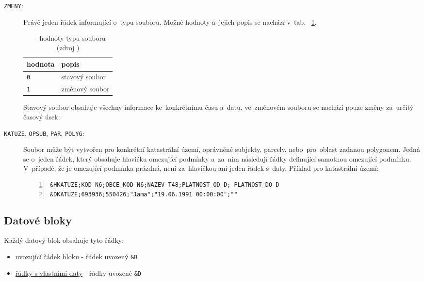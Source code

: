 \begin{description}
	\item[\texttt{ZMENY}:] Právě jeden řádek informující o~typu
souboru. Možné hodnoty a~jejich popis se nachází v~tab.~
\ref{tab:zmeny}.

    \begin{table}[H]
        \begin{tabular}{|l|l|} \hline hodnota & popis \\ \hline \hline
\texttt{0} & stavový soubor \\ \hline \texttt{1} & změnový soubor \\
\hline
        \end{tabular} \centering
        \caption[~– hodnoty typu souborů]{~– hodnoty
typu souborů (zdroj \citep{struktura_vfk})}
        \label{tab:zmeny}
    \end{table}

Stavový soubor obsahuje všechny informace ke~konkrétnímu času a~datu,
ve~změno\-vém souboru se nachází pouze změny za~určitý časový úsek.

	\item[\texttt{KATUZE}, \texttt{OPSUB}, \texttt{PAR},
\texttt{POLYG}:] Soubor  může být vytvořen pro konkrétní
kata\-strální území, oprávněné subjekty, parcely, nebo~pro~oblast
zadanou polygonem. Jedná se o~jeden řádek, který obsahuje hlavičku
omezující podmínky a~za~ním následují řádky definující samotnou
omezující podmínku. V~případě, že je omezující podmínka prázdná, není
za~hlavičkou ani jeden řádek s~daty. Příklad pro katastrální území:

\begin{lstlisting}[basicstyle=\footnotesize\ttfamily, backgroundcolor
    = \color{light-gray}, numbers=left]
&HKATUZE;KOD N6;OBCE_KOD N6;NAZEV T48;PLATNOST_OD D; PLATNOST_DO D
&DKATUZE;693936;550426;"Jama";"19.06.1991 00:00:00";""
 \end{lstlisting}

\end{description}

\subsection{Datové bloky}
\label{datove_bloky}

Každý datový blok obsahuje tyto řádky:
	\begin{itemize}[leftmargin=1.5cm, noitemsep]
		\item \underline{uvozující řádek bloku} - řádek
uvozený \texttt{\&B}
		\item \underline{řádky s vlastními daty} - řádky
uvozené \texttt{\&D}
	\end{itemize}

